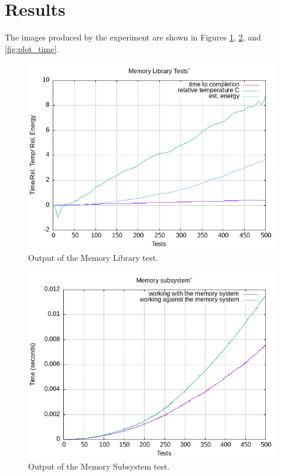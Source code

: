 \documentclass[12pt]{article}
\begin{document}
\section{Results}\label{sec:results}

The images produced by the experiment are shown in Figures \ref{fig:plot_memlib}, \ref{fig:plot_memsys}, and \ref{fig:plot_time}.

\begin{figure}[htbp]
\centering
\includegraphics[width=1.0\textwidth]{../../data/ee_course/plot_memlib.jpg} %
\caption{Output of the Memory Library test.}
\label{fig:plot_memlib}
\end{figure}

\begin{figure}[htbp]
\centering
\includegraphics[width=1.0\textwidth]{../../data/ee_course/plot_memsys.jpg} %
\caption{Output of the Memory Subsystem test.}
\label{fig:plot_memsys}
\end{figure}
\end{document}

